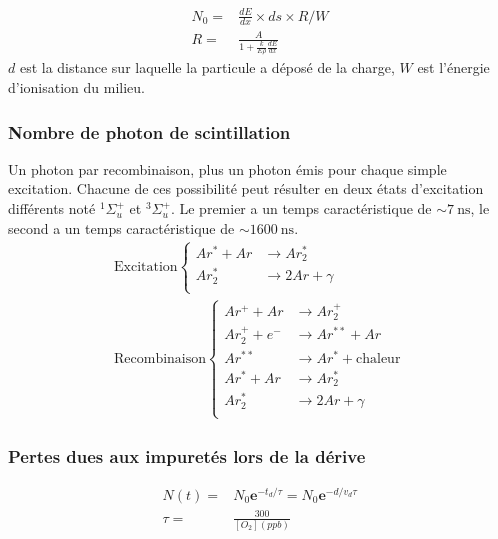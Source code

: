         \cite{Amoruso2004}
        \begin{eqnarray}
          N_0= &\frac{dE}{dx}\times ds \times R/W\label{eq::N0}\\
         R = & \frac{A}{1+\frac{k}{E\rho}\frac{dE}{dx}}\label{eq::R}
        \end{eqnarray}
        $d$ est la distance sur laquelle la particule a déposé de la charge, $W$ est l'énergie d'ionisation du milieu.
      \subsubsection{Nombre de photon de scintillation}
        
        Un photon par recombinaison, plus un photon émis pour chaque simple excitation\cite{Doke2002}. Chacune de ces possibilité peut résulter en deux états d'excitation différents noté $^1\Sigma_u^+$ et  $^3\Sigma_u^+$. Le premier a un temps caractéristique de $\sim\SI{7}{\nano\second}$, le second a un temps caractéristique de $\sim\SI{1600}{\nano\second}$\cite{Hitachi1983}.
        \begin{equation} \label{eq::scintilation}
            \begin{split}
            \text{Excitation}\begin{cases}
            Ar^* + Ar & \to Ar_2^* \\
            Ar_2^* & \to 2Ar + \gamma\\
            \end{cases} \\
            \text{Recombinaison}\begin{cases}
            Ar^+ + Ar & \to Ar_2^+  \\
            Ar_2^+ + e^- & \to Ar^{**}+Ar  \\
            Ar^{**} & \to Ar^*+\text{chaleur}  \\
            Ar^* + Ar & \to Ar_2^*  \\
            Ar_2^* & \to 2Ar + \gamma \\
            \end{cases}
            \end{split}
        \end{equation}
      \subsubsection{Pertes dues aux impuretés lors de la dérive}
        \cite{Buckley1989}
        \begin{eqnarray}
          N(t) = & N_0\textbf{e}^{-t_d/\tau}=N_0\textbf{e}^{-d/v_d\tau}\label{eq::losses} \\
          \tau = & \frac{300}{[O_2](\si{ppb})}\label{eq::purity}
        \end{eqnarray}
